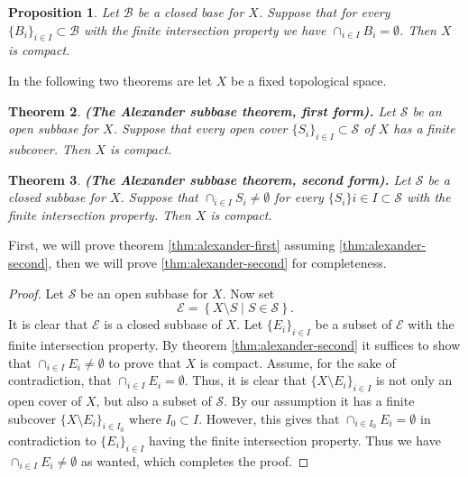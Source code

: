 \documentclass[11pt,a4paper]{article}
\theoremstyle{definition}
\theoremstyle{plain}
\newtheorem{theorem}{Theorem}[section]
\newtheorem{proposition}[theorem]{Proposition}
\newcommand{\set}[2]{ \left\{ #1 \mid #2 \right\} }
\renewcommand{\tt}[1]{\textnormal{\textbf{(#1).}}} %
\begin{document}
  \begin{proposition}\label{prp:alexander}
    Let $\mathcal{B}$ be a closed base for $X$. Suppose that for every 
    $\{B_i\}_{i \in I} \subset \mathcal{B}$ with the finite intersection 
    property we have $\cap_{i \in I}{B_i} = \emptyset$. Then $X$ is 
    compact.
  \end{proposition}

  In the following two theorems are let $X$ be a fixed topological space.

  \begin{theorem}\label{thm:alexander-first}
    \tt{The Alexander subbase theorem, first form}
    Let $\mathcal{S}$ be an open subbase for $X$. Suppose that every 
    open cover $\{S_i\}_{i \in I} \subset \mathcal{S}$ of $X$ has a 
    finite subcover. Then $X$ is compact.
  \end{theorem}

  \begin{theorem}\label{thm:alexander-second}
    \tt{The Alexander subbase theorem, second form}
    Let $\mathcal{S}$ be a closed subbase for $X$. Suppose that 
    $\cap_{i \in I}{S_i} \neq \emptyset$ for every 
    $\{S_i\}{i \in I} \subset \mathcal{S}$ with the finite intersection 
    property. Then $X$ is compact.
  \end{theorem}

  First, we will prove theorem \autoref{thm:alexander-first} assuming
  \autoref{thm:alexander-second}, then we will prove 
  \autoref{thm:alexander-second} for completeness.
  \begin{proof}
    Let $\mathcal S$ be an open subbase for $X$. Now set
    \[
      \mathcal E = \set{X \setminus S}{S \in \mathcal S}.
    \]
    It is clear that $\mathcal E$ is a closed subbase of $X$.
    Let $\{E_i\}_{i \in I}$ be a subset of $\mathcal E$ with the finite
    intersection property.
    By theorem \autoref{thm:alexander-second} it suffices to show that
    $\cap_{i \in I}{E_i} \neq \emptyset$ to prove that $X$ is compact.
    Assume, for the sake of contradiction, 
    that $\cap_{i \in I}{E_i} = \emptyset$.
    Thus, it is clear that $\{X \setminus E_i\}_{i \in I}$ is not only an
    open cover of $X$, but also a subset of $\mathcal S$. By our assumption
    it has a finite subcover $\{X \setminus E_i\}_{i \in I_0}$
    where $I_0 \subset I$. However, this gives that
    $\cap_{i \in I_0} E_i = \emptyset$ in contradiction to $\{E_i\}_{i \in I}$
    having the finite intersection property.
    Thus we have $\cap_{i \in I}{E_i} \neq \emptyset$ as wanted, which
    completes the proof.
  \end{proof}
\end{document}
